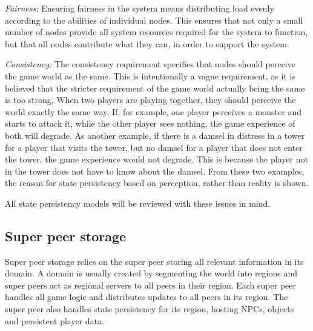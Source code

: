 \documentclass[10pt,a4paper,journal,cspaper,compsoc]{IEEEtran}
\begin{document}
\emph{Fairness:} Ensuring fairness in the system means distributing load evenly according to the abilities of individual nodes. This ensures that
    not only a small number of nodes provide all system resources required for the system to function, but that all nodes contribute what they
    can, in order to support the system.

\emph{Consistency:} The consistency requirement specifies that nodes should perceive the game world as the same. This is intentionally a vague
    requirement, as it is believed that the stricter requirement of the game world actually being the same is too strong. When two players are
    playing together, they should perceive the world exactly the same way. If, for example, one player perceives a monster and starts to attack
    it, while the other player sees nothing, the game experience of both will degrade. As another example, if there is a damsel in distress in a
    tower for a player that visits the tower, but no damsel for a player that does not enter the tower, the game experience would not degrade.
    This is because the player not in the tower does not have to know about the damsel. From these two examples, the reason for state persistency
    based on perception, rather than reality is shown.

All state persistency models will be reviewed with these issues in mind.

\subsection{Super peer storage}
\label{super_peer_storage}

Super peer storage relies on the super peer storing all relevant information in its domain. A domain is usually created by segmenting the world into
regions and super peers act as regional servers to all peers in their region. Each super peer handles all game logic and distributes updates to all
peers in its region. The super peer also handles state persistency for its region, hosting NPCs, objects and persistent player data.
\end{document}
